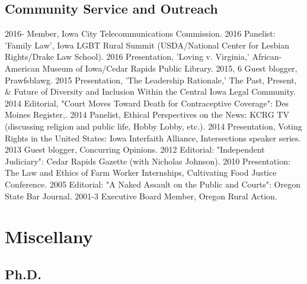 \documentclass[letterpaper]{moderncv}
\begin{document}
\subsection{Community Service and Outreach}
\cvitem
{2016-}
{Member, Iowa City Telecommunications Commission.}
\vspace{1mm}
\cvitem
{2016}
{Panelist: 'Family Law', Iowa LGBT Rural Summit (USDA/National Center for Lesbian Rights/Drake Law School).}
\vspace{1mm}
\cvitem
{2016}
{Presentation, 'Loving v. Virginia,' African-American Museum of Iowa/Cedar Rapids Public Library.}
\vspace{1mm}
\cvitem
{2015, 6}
{Guest blogger, Prawfsblawg.}
\vspace{1mm}
\cvitem
{2015}
{Presentation, 'The Leadership Rationale,' The Past, Present, \& Future of Diversity and Inclusion Within the Central Iowa Legal Community.}
\vspace{1mm}
\cvitem
{2014}
{Editorial, "Court Moves Toward Death for Contraceptive Coverage": Des Moines Register,.}
\vspace{1mm}
\cvitem
{2014}
{Panelist, Ethical Perspectives on the News: KCRG TV (discussing religion and public life, Hobby Lobby, etc.).}
\vspace{1mm}
\cvitem
{2014}
{Presentation, Voting Rights in the United States: Iowa Interfaith Alliance, Intersections speaker series.}
\vspace{1mm}
\cvitem
{2013}
{Guest blogger, Concurring Opinions.}
\vspace{1mm}
\cvitem
{2012}
{Editorial: "Independent Judiciary": Cedar Rapids Gazette (with Nicholas Johnson).}
\vspace{1mm}
\cvitem
{2010}
{Presentation: The Law and Ethics of Farm Worker Internships, Cultivating Food Justice Conference.}
\vspace{1mm}
\cvitem
{2005}
{Editorial: "A Naked Assault on the Public and Courts": Oregon State Bar Journal.}
\vspace{1mm}
\cvitem
{2001-3}
{Executive Board Member, Oregon Rural Action.}
\vspace{1mm}
% 
%
\section{Miscellany}
\subsection{Ph.D.}
\end{document}
